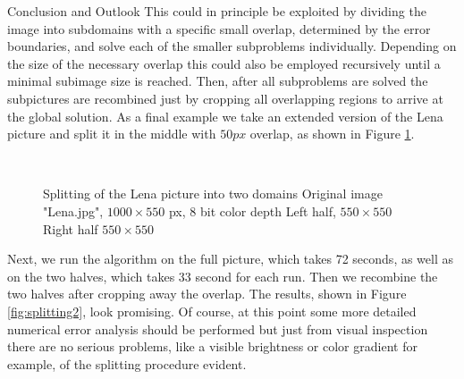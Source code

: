 \begin{chapter}{Conclusion and Outlook}
This could in principle be exploited by dividing the image into subdomains with a specific small overlap, determined by the error boundaries, and solve each of the smaller 
subproblems individually. Depending on the size of the necessary overlap this could also be employed recursively until a minimal subimage size is reached. Then, after all subproblems
are solved the subpictures are recombined just by cropping all overlapping regions to arrive at the global solution.
As a final example we take an extended version of the Lena picture and split it in the middle with $50px$ overlap, as shown in Figure \ref{fig:splitting1}.

\begin{figure}[h!]
    \centering
    \\
    \caption[Splitting the image domain]{Splitting of the Lena picture into two domains
	 Original image "Lena.jpg", $1000\times 550$ px, 8 bit color depth
	 Left half, $550\times 550$
	 Right half $550\times 550$
	\label{fig:splitting1}
    }
\end{figure}
Next, we run the algorithm on the full picture, which takes 72 seconds, as well as on the two halves, which takes 
33 second for each run. Then we recombine the two halves after cropping away the overlap. The results, shown in
Figure \ref{fig:splitting2}, look promising. Of course, at this point some more detailed numerical error analysis
should be performed but just from visual inspection there are no serious problems, like a visible brightness or color gradient for example, of the splitting procedure evident.\\


\end{chapter}
